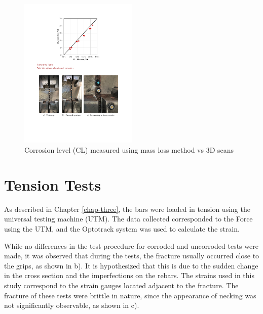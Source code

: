 \begin{figure}[htbp]
	\centering
    \includegraphics[width=0.5\textwidth]{VAC Thesis 2.0/Chapter-4/figs/3dscans_vs_massloss.pdf}
	\caption{Corrosion level (CL) measured using mass loss method vs 3D scans}
\label{fig:3dscans_vs_massloss}
\end{figure}

\newpage
\section{Tension Tests}

As described in Chapter \ref{chap-three}, the bars were loaded in tension using the universal testing machine (UTM). The data collected corresponded to the Force using the UTM, and the Optotrack system was used to calculate the strain.

While no differences in the test procedure for corroded and uncorroded tests were made, it was observed that during the tests, the fracture usually occurred close to the grips, as shown in  
b). It is hypothesized that this is due to the sudden change in the cross section and the imperfections on the rebars. The strains used in this study correspond to the strain gauges located adjacent to the fracture. The fracture of these tests were brittle in nature, since the appearance of necking was not significantly observable, as shown in   c).

